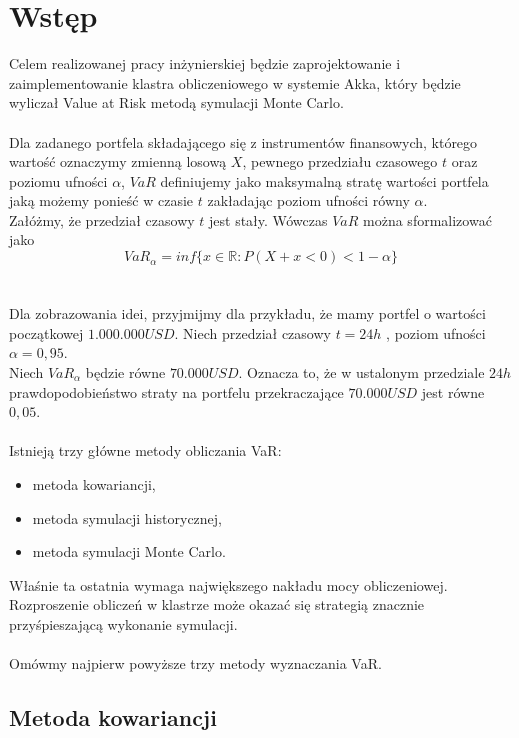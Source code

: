 \documentclass[11pt,titlepage]{article}
\begin{document}
\section{Wstęp}      %



Celem realizowanej pracy inżynierskiej będzie zaprojektowanie i zaimplementowanie klastra obliczeniowego w systemie Akka, który będzie wyliczał Value at Risk metodą symulacji Monte Carlo. 
\\
\\
Dla zadanego portfela składającego się z instrumentów finansowych, którego wartość oznaczymy zmienną losową $X$, pewnego przedziału czasowego $t$ oraz poziomu ufności $\alpha$, $VaR$ definiujemy jako maksymalną stratę wartości portfela jaką możemy ponieść w czasie $t$ zakładając poziom ufności równy $\alpha$.
\\
Załóżmy, że przedział czasowy $t$ jest stały. Wówczas $VaR$ można sformalizować jako
$$VaR_{\alpha}=inf\{ x\in \mathbb{R}:P(X+x<0) <  1-\alpha \}$$
\\
\\
Dla zobrazowania idei, przyjmijmy dla przykładu, że mamy portfel o wartości początkowej $1.000.000 USD$. Niech przedział czasowy $t=24h$ , poziom ufności $\alpha=0,95$. 
\\
Niech $VaR_{\alpha}$ będzie równe $70.000 USD$. Oznacza to, że w ustalonym przedziale $24h$ prawdopodobieństwo straty na portfelu przekraczające $70.000 USD$ jest równe $0,05$.  
\\
\\
\noindent Istnieją trzy główne metody obliczania VaR:

\begin{itemize}
  \item metoda kowariancji,
	\item metoda symulacji historycznej,
	\item metoda symulacji Monte Carlo.

\end{itemize}
Właśnie ta ostatnia wymaga największego nakładu mocy obliczeniowej. Rozproszenie obliczeń w klastrze może okazać się strategią znacznie przyśpieszającą wykonanie symulacji. 
\\
\\
Omówmy najpierw powyższe trzy metody wyznaczania VaR. 


\subsection{Metoda kowariancji}
\end{document}
